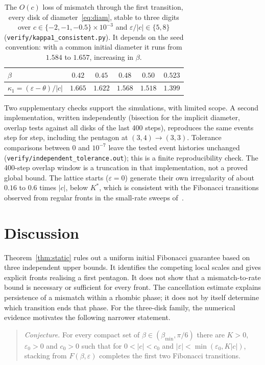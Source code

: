 \documentclass[11pt]{amsart}
\theoremstyle{definition}
\newcommand{\eps}{\varepsilon}
\begin{document}
\begin{table}[h]
\centering\small
\begin{tabular}{@{}lccccc@{}}
\toprule
$\beta$ & $0.42$ & $0.45$ & $0.48$ & $0.50$ & $0.523$\\
\midrule
$\kappa_1=(\eps-\theta)/|c|$ & $1.665$ & $1.622$ & $1.568$ & $1.518$ & $1.399$\\
\bottomrule
\end{tabular}
\caption{The $O(c)$ loss of mismatch through the first transition, every disk of
diameter~\eqref{eq:diam}, stable to three digits over $c\in\{-2,-1,-0.5\}\times10^{-3}$ and
$\eps/|c|\in\{5,8\}$ (\texttt{verify/kappa1\_consistent.py}). It depends on the seed convention: with a
common initial diameter it runs from $1.584$ to $1.657$, increasing in $\beta$.}\label{tab:kappa1}
\end{table}

Two supplementary checks support the simulations, with limited scope. A second implementation, written independently (bisection for the
implicit diameter, overlap tests against all disks of the last 400 steps), reproduces the same events step
for step, including the pentagon at $(3,4)\to(3,3)$. Tolerance comparisons between $0$ and $10^{-7}$ leave the tested event histories unchanged
(\texttt{verify/independent\_tolerance.out}); this is a finite reproducibility check. The
400-step overlap window is a truncation in that implementation, not a proved global bound. The lattice starts ($\eps=0$) generate their own irregularity of about $0.16$ to $0.6$ times
$|c|$, below $K^*$, which is consistent with the Fibonacci transitions observed from regular fronts
in the small-rate sweeps of~\cite{GDD}.

\section{Discussion}\label{sec:discussion}

Theorem~\ref{thm:static} rules out a uniform initial Fibonacci guarantee based on three
independent upper bounds. It identifies the competing local scales and gives explicit
fronts realising a first pentagon. It does not show that a mismatch-to-rate bound is necessary
or sufficient for every front. The cancellation estimate explains persistence of a mismatch
within a rhombic phase; it does not by itself determine which transition ends that phase.
For the three-disk family, the numerical evidence motivates the following narrower statement.

\begin{quote}
\emph{Conjecture.} For every compact set of $\beta\in(\beta_{\min},\pi/6)$ there are $K>0$, $\eps_0>0$ and
$c_0>0$ such that for $0<|c|<c_0$ and $|\eps|<\min(\eps_0,K|c|)$, stacking from $F(\beta,\eps)$ completes the
first two Fibonacci transitions.
\end{quote}
\end{document}
